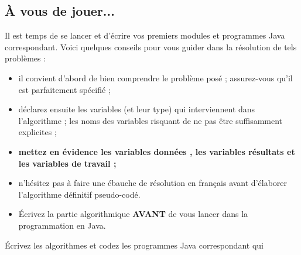 \documentclass[11pt,a4paper]{article}
\begin{document}
            \par
        \subsection{\`A vous de jouer...}
          Il est temps de se lancer et d'\'ecrire vos premiers modules et programmes Java correspondant. 
          Voici quelques conseils pour vous guider dans la r\'esolution de tels probl\`emes :
          
					\begin{itemize}
				
			\item il convient d'abord de bien comprendre le probl\`eme pos\'e ; assurez-vous qu'il est parfaitement sp\'ecifi\'e ;
			\item d\'eclarez ensuite les variables (et leur type) qui interviennent dans l'algorithme ; les noms des variables risquant de ne pas \^etre suffisamment explicites ;
			\item \textbf{mettez en \'evidence les variables \guillemotleft  donn\'ees \guillemotright , les variables \guillemotleft  r\'esultats \guillemotright  et les variables de travail ;}
			\item n'h\'esitez pas \`a faire une \'ebauche de r\'esolution en fran\c cais avant d'\'elaborer l'algorithme d\'efinitif pseudo-cod\'e.
			\item \'Ecrivez la partie algorithmique \textbf{AVANT} de vous lancer dans la programmation en Java.
					\end{itemize}
				
            \par
        
        \'Ecrivez les algorithmes et codez les programmes Java correspondant qui 
          
\end{document}
